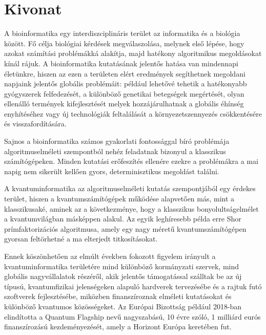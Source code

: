 \setcounter{page}{1}

\selecthungarian

\chapter*{Kivonat}

A bioinformatika egy interdiszciplináris terület az informatika és a biológia között. Fő célja biológiai kérdések megválaszolása, melynek első lépése, hogy azokat számítási problémákká alakítja, majd hatékony algoritmikus megoldásokat kínál rájuk. A bioinformatika kutatásának jelentős hatása van mindennapi életünkre, hiszen az ezen a területen elért eredmények segíthetnek megoldani napjaink jelentős globális problémáit: például lehetővé tehetik a hatékonyabb gyógyszerek felfedezését, a különböző genetikai betegségek megértését, olyan ellenálló termények kifejlesztését melyek hozzájárulhatnak a globális éhínség enyhítéséhez vagy új technológiák feltalálását a környezetszennyezés csökkentésére és visszafordítására.

Sajnos a bioinformatika számos gyakorlati fontossággal bíró problémája algoritmuselméleti szempontból nehéz feladatnak bizonyul a klasszikus számítógépeken. Minden kutatási erőfeszítés ellenére ezekre a problémákra a mai napig nem sikerült kellően gyors, determinisztikus megoldást találni.

A kvantuminformatika az algoritmuselméleti kutatás szempontjából egy érdekes terület, hiszen a kvantumszámítógépek működése alapvetően más, mint a klasszikusaké, aminek az a következménye, hogy a klasszikus bonyolultságelmélet a kvantumvilágban másképpen alakul. Az egyik leghíresebb példa erre Shor prímfaktorizációs algoritmusa, amely egy nagy méretű kvantumszámítógépen gyorsan feltörhetné a ma elterjedt titkosításokat.

Ennek köszönhetően az elmúlt években fokozott figyelem irányult a kvantuminformatika területére mind különböző kormányzati szervek, mind globális nagyvállalatok részéről, akik jelentős támogatással szálltak be az új típusú, kvantumfizikai jelenségeken alapuló hardverek tervezésébe és a rajtuk futó szoftverek fejlesztésébe, miközben finanszíroznak elméleti kutatásokat és különböző kvantumos közösségeket. Az Európai Bizottság például 2018-ban elindította a Quantum Flagship nevű nagyszabású, 10 évre szóló, 1 milliárd eurós finanszírozású kezdeményezését, amely a Horizont Európa keretében fut.

